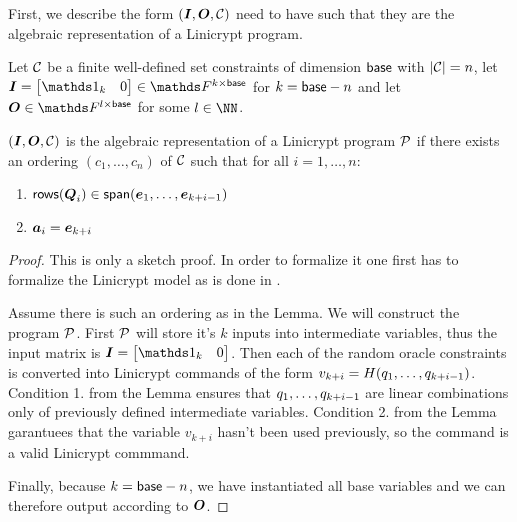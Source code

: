 First, we describe the form $(\I, \O, \C)$ need to have such that they are the algebraic representation of a Linicrypt program.
\begin{lemma}
    Let $\C$ be a finite well-defined set constraints of dimension $\base$ with $|\C| = n$,
    let $\I = \m{\Id_k & 0} \in \F^{k\times\base}$ for $k = \base - n$
    and let $\O \in \F^{l \times \base}$ for some $l \in \NN$.
       
    $(\I, \O, \C)$ is the algebraic representation of a Linicrypt program $\P$
    if there exists an ordering $(c_1, \dots, c_n)$ of $\C$
    such that for all $i=1, \dots, n$:
    \begin{enumerate}
    \item
    $\rows(\Q_i) \in \spn(\dts \ve {k+i-1})$
    \item
    $\va_i = \ve_{k+i}$
    \end{enumerate}
\end{lemma}

\begin{proof}
    This is only a sketch proof.
    In order to formalize it one first has to formalize the Linicrypt model as is done in \cite{C:CarRos16}.

    Assume there is such an ordering as in the Lemma.
    We will construct the program $\P$.
    First $\P$ will store it's $k$ inputs into intermediate variables,
    thus the input matrix is $\I = \m{\Id_k & 0}$.
    Then each of the random oracle constraints is converted into Linicrypt commands of the form
    $v_{k+i} = H(\dts q {k+i-1})$.
    Condition 1. from the Lemma ensures that $\dts q {k+i-1}$ are linear combinations only of previously defined intermediate variables.  
    Condition 2. from the Lemma garantuees that the variable $v_{k+i}$ hasn't been used previously,
    so the command is a valid Linicrypt commmand.
    
    Finally, because $k=\base - n$, we have instantiated all base variables and we can therefore output according to $\O$.
\end{proof}

